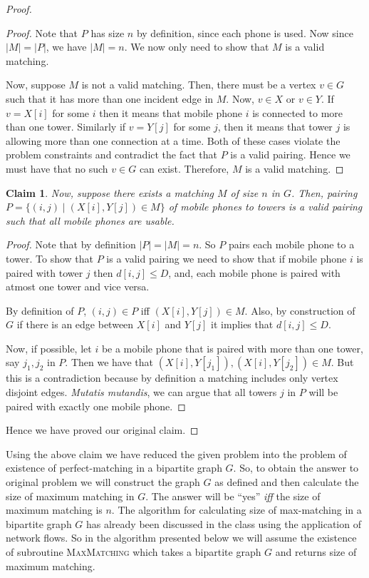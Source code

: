 \documentclass[answers]{exam}
\newtheorem{claim}{Claim}
\begin{document}
\begin{questions}
\begin{solution}
\begin{proof}
\begin{proof}
Note that $P$ has size $n$ by definition, since each phone is used. Now since $|M| = |P|$, we have $|M| = n$. We now only need to show that $M$ is a valid matching.

Now, suppose $M$ is not a valid matching. Then, there must be a vertex $v \in G$ such that it has more than one incident edge in $M$. Now, $v \in X$ or $v \in Y$. If $v = X[i]$ for some $i$ then it means that mobile phone $i$ is connected to more than one tower. Similarly if $v = Y[j]$ for some $j$, then it means that tower $j$ is allowing more than one connection at a time. Both of these cases violate the problem constraints and contradict the fact that $P$ is a valid pairing. Hence we must have that no such $v \in G$ can exist. Therefore, $M$ is a valid matching.
\end{proof}
\begin{claim}
Now, suppose there exists a matching $M$ of size $n$ in $G$. Then, pairing $P = \{(i, j) \mid (X[i], Y[j]) \in M\}$ of mobile phones to towers is a valid pairing such that all mobile phones are usable.
\end{claim}
\begin{proof}
Note that by definition $|P| = |M| = n$. So $P$ pairs each mobile phone to a tower. To show that $P$ is a valid pairing we need to show that if mobile phone $i$ is paired with tower $j$ then $d[i,j] \leq D$, and, each mobile phone is paired with atmost one tower and vice versa.

By definition of $P$, $(i,j) \in P$ iff $(X[i], Y[j]) \in M$. Also, by construction of $G$ if there is an edge between $X[i]$ and $Y[j]$ it implies that $d[i,j] \leq D$.

Now, if possible, let $i$ be a mobile phone that is paired with more than one tower, say $j_1, j_2$ in $P$. Then we have that $(X[i], Y[j_1]), (X[i], Y[j_2]) \in M$. But this is a contradiction because by definition a matching includes only vertex disjoint edges. \textit{Mutatis mutandis}, we can argue that all towers $j$ in $P$ will be paired with exactly one mobile phone.
\end{proof}
Hence we have proved our original claim.
\end{proof}
Using the above claim we have reduced the given problem into the problem of existence of perfect-matching in a bipartite graph $G$. So, to obtain the answer to original problem we will construct the graph $G$ as defined and then calculate the size of maximum matching in $G$. The answer will be ``yes'' \emph{iff} the size of maximum matching is $n$. The algorithm for calculating size of max-matching in a bipartite graph $G$ has already been discussed in the class using the application of network flows. So in the algorithm presented below we will assume the existence of subroutine \textsc{MaxMatching} which takes a bipartite graph $G$ and returns size of maximum matching.


\end{solution}
\end{questions}
\end{document}
